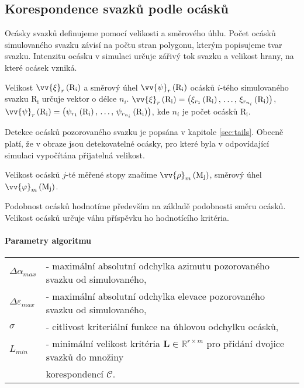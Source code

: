 \newpage
\subsection{Korespondence svazků podle ocásků}
\label{sec: korespondence_ocasky}
		
	Ocásky svazků definujeme pomocí velikosti a směrového úhlu.	Počet ocásků simulovaného svazku závisí na počtu stran polygonu, kterým popisujeme tvar svazku. Intenzitu ocásku v simulaci určuje zářivý tok svazku a velikost hrany, na které ocásek vzniká. 
	
	Velikost $\vv{\xi}_{r}\left(\mathrm{R_i}\right)$ a směrový úhel $\vv{\psi}_{r}\left(\mathrm{R_i}\right)$ ocásků  $i$-tého simulovaného svazku $\mathrm{R_i}$ určuje vektor o délce $n_i$. $\vv{\xi}_{r}\left(\mathrm{R_i}\right) = \left(\xi_{r_1}\left(\mathrm{R_i}\right),\,\dots,\,\xi_{r_{n_i}}\left(\mathrm{R_i}\right)\right)$, $\vv{\psi}_{r}\left(\mathrm{R_i}\right) = \left(\psi_{r_1}\left(\mathrm{R_i}\right),\,\dots,\,\psi_{r_{n_i}}\left(\mathrm{R_i}\right)\right)$, kde $n_i$ je počet ocásků $\mathrm{R_i}$. 
	
	Detekce ocásků pozorovaného svazku je popsána v kapitole \ref{sec:tails}. Obecně platí, že v obraze jsou detekovatelné ocásky, pro které byla v odpovídající simulaci vypočítána přijatelná velikost. 
	
	Velikost ocásků $j$-té měřené stopy značíme $\vv{\rho}_{m}\left(\mathrm{M_j}\right)$, směrový úhel $\vv{\varphi}_{m}\left(\mathrm{M_j}\right)$. 
	 
	 Podobnost ocásků hodnotíme především na základě podobnosti směru ocásků. Velikost ocásků určuje váhu  příspěvku ho hodnotícího kritéria.
	 
\paragraph{Parametry algoritmu}
\hspace{1mm}
	 
	 \begin{tabular}{l L{13.5cm}}
	 $\Delta\alpha_{max}$ & - maximální absolutní odchylka azimutu pozorovaného svazku od simulovaného,\\
	 $\Delta\varepsilon_{max}$ & - maximální absolutní odchylka elevace pozorovaného svazku od simulovaného,\\
	 $\sigma$ & - citlivost kriteriální funkce na úhlovou odchylku ocásků,\\
	 $L_{min}$ &  - minimální velikost kritéria  $\mathbf{L} \in \mathbb{R}^{r\times m}$ pro přidání dvojice svazků do množiny\\ &korespondencí $\mathcal{C}$. \\
	 \end{tabular}
	
